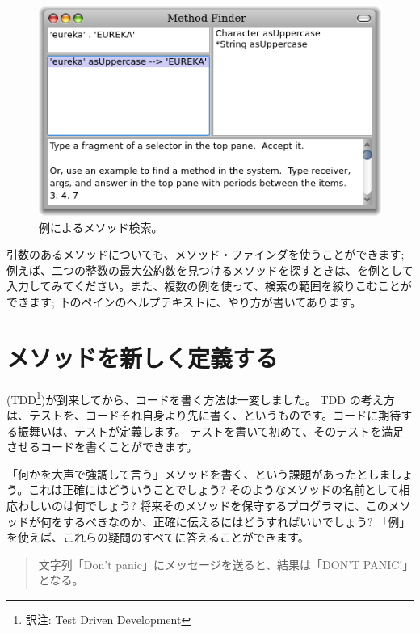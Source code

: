 \documentclass[a4paper,10pt,twoside]{book}
\begin{document}
\begin{figure}[hbt]
\centerline {\includegraphics[width=\textwidth]{MethodFinder-example1}}
\caption{例によるメソッド検索。
}
\end{figure}

引数のあるメソッドについても、メソッド・ファインダを使うことができます; 例えば、二つの整数の最大公約数を見つけるメソッドを探すときは、を例として入力してみてください。また、複数の例を使って、検索の範囲を絞りこむことができます; 下のペインのヘルプテキストに、やり方が書いてあります。

\section{メソッドを新しく定義する}

\cite{Beck03a} (TDD\footnote{訳注: Test Driven Development})が到来してから、コードを書く方法は一変しました。
TDD の考え方は、テストを、コードそれ自身より先に書く、というものです。コードに期待する振舞いは、テストが定義します。
テストを書いて初めて、そのテストを満足させるコードを書くことができます。

「何かを大声で強調して言う」メソッドを書く、という課題があったとしましょう。これは正確にはどういうことでしょう? そのようなメソッドの名前として相応わしいのは何でしょう? 将来そのメソッドを保守するプログラマに、このメソッドが何をするべきなのか、正確に伝えるにはどうすればいいでしょう? 「例」を使えば、これらの疑問のすべてに答えることができます。

\begin{quote}
文字列「Don't panic」にメッセージを送ると、結果は「DON'T PANIC!」となる。
\end{quote}
\end{document}
